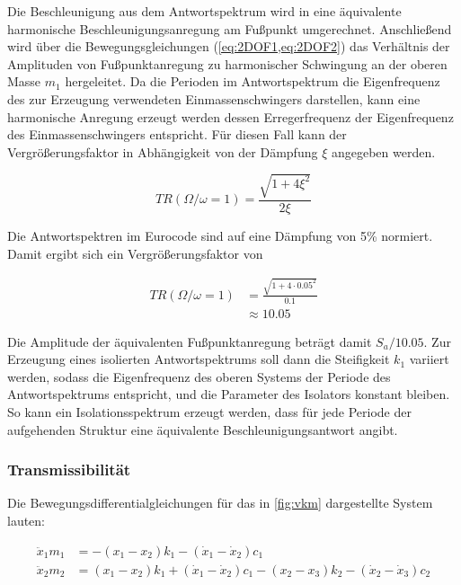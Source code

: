 Die Beschleunigung aus dem Antwortspektrum wird in eine äquivalente harmonische Beschleunigungsanregung am Fußpunkt umgerechnet.
Anschließend wird über die Bewegungsgleichungen (\cref{eq:2DOF1,eq:2DOF2}) das Verhältnis der Amplituden von Fußpunktanregung zu harmonischer Schwingung an der oberen Masse $m_1$ hergeleitet.
Da die Perioden im Antwortspektrum die Eigenfrequenz des zur Erzeugung verwendeten Einmassenschwingers darstellen, kann eine harmonische Anregung erzeugt werden dessen Erregerfrequenz der Eigenfrequenz des Einmassenschwingers entspricht.
Für diesen Fall kann der Vergrößerungsfaktor in Abhängigkeit von der Dämpfung $\xi$ angegeben werden.

\begin{equation} \label{eq:1DOF}
TR(\Omega/\omega = 1) = \frac{\sqrt{1 + 4 \xi^2}}{2 \xi}
\end{equation}

Die Antwortspektren im Eurocode sind auf eine Dämpfung von 5\% normiert. Damit ergibt sich ein Vergrößerungsfaktor von

\begin{align*}
TR(\Omega/\omega = 1) &= \frac{\sqrt{1 + 4 \cdot 0.05^2}}{0.1}\\
                      &\approx 10.05 
\end{align*}

Die Amplitude der äquivalenten Fußpunktanregung beträgt damit $S_a/10.05$.
Zur Erzeugung eines isolierten Antwortspektrums soll dann die Steifigkeit $k_1$ variiert werden, sodass die Eigenfrequenz des oberen Systems der Periode des Antwortspektrums entspricht, und die Parameter des Isolators konstant bleiben.
So kann ein Isolationsspektrum erzeugt werden, dass für jede Periode der aufgehenden Struktur eine äquivalente Beschleunigungsantwort angibt.

\subsubsection{Transmissibilität}
\label{sec:transm}

Die Bewegungsdifferentialgleichungen für das in \cref{fig:vkm} dargestellte System lauten:

\begin{align}
\ddot x_1 m_1 &= -(x_1 - x_2) k_1 -(\dot x_1 - \dot x_2) c_1 \label{eq:BewegDGL1}\\
\ddot x_2 m_2 &= (x_1 - x_2) k_1 + (\dot x_1 - \dot x_2) c_1 - (x_2 - x_3) k_2 - (\dot x_2 - \dot x_3) c_2 \label{eq:BewegDGL2}
\end{align}


